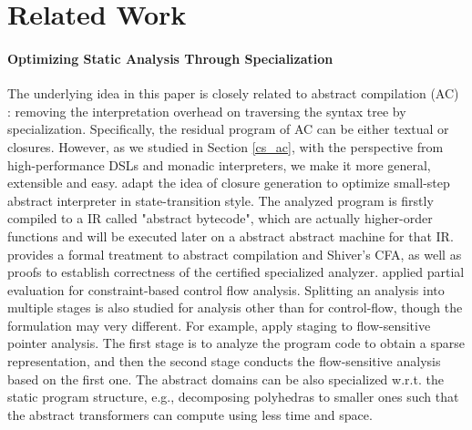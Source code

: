 \section{Related Work}

\paragraph{Optimizing Static Analysis Through Specialization}
The underlying idea in this paper is closely related to abstract compilation (AC)
\cite{Boucher:1996:ACN:647473.727587}: removing the interpretation overhead on
traversing the syntax tree by specialization. Specifically, the residual program
of AC can be either textual or closures. However, as we studied in Section
\ref{cs_ac}, with the perspective from high-performance DSLs and monadic
interpreters, we make it more general, extensible and easy.
\citet{Johnson:2013:OAA:2500365.2500604} adapt the idea of closure
generation to optimize small-step abstract interpreter in state-transition
style. The analyzed program is firstly compiled to a IR called "abstract
bytecode", which are actually higher-order functions and will be executed later
on a abstract abstract machine for that IR. \citet{damian1999partial} provides a
formal treatment to abstract compilation and Shiver's CFA, as well as proofs to
establish correctness of the certified specialized analyzer.
\citet{amtoft1999partial} applied partial evaluation for constraint-based
control flow analysis. Splitting an analysis into multiple stages is also
studied for analysis other than for control-flow, though the formulation may
very different. For example, \citet{DBLP:conf/cgo/HardekopfL11} apply staging to
flow-sensitive pointer analysis. The first stage is to analyze the program code
to obtain a sparse representation, and then the second stage conducts the
flow-sensitive analysis based on the first one.
The abstract domains can be also specialized w.r.t. the static program
structure, e.g., decomposing polyhedras \cite{DBLP:conf/popl/SinghPV17,
Singh:2017:PCD:3177123.3158143} to smaller ones such that the abstract
transformers can compute using less time and space.

